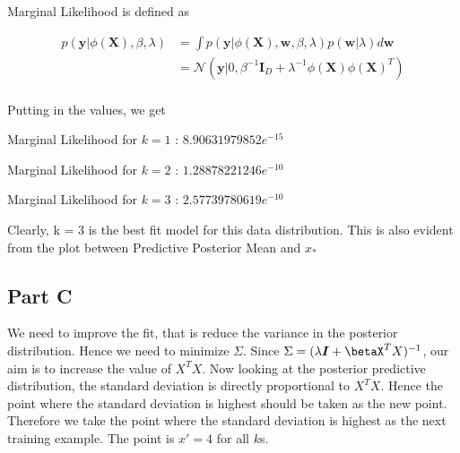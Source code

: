\documentclass{article}
\begin{document}
\begin{addmargin}{1.5em}
\begin{addmargin}{1.5em}
        Marginal Likelihood is defined as
        
        \begin{align*}
            p(\boldsymbol{y} | \phi(\boldsymbol{X}), \beta, \lambda) &= \int p(\boldsymbol{y} | \phi(\boldsymbol{X}), \boldsymbol{w}, \beta, \lambda)p(\boldsymbol{w} | \lambda)d\boldsymbol{w} \\
                                                                     &= \mathcal{N}(\boldsymbol{y} | 0, \beta^{-1}\boldsymbol{I}_D + \lambda^{-1}\phi(\boldsymbol{X})\phi(\boldsymbol{X})^T) \\
        \end{align*}
        
        Putting in the values, we get
        
        \begin{addmargin}{1.5em}
            Marginal Likelihood for $k = 1$ : $8.90631979852e^{-15}$
            
            Marginal Likelihood for $k = 2$ : $1.28878221246e^{-10}$
            
            Marginal Likelihood for $k = 3$ : $2.57739780619e^{-10}$
        \end{addmargin}
        
        Clearly, k = 3 is the best fit model for this data distribution. This is also evident from the plot between Predictive Posterior Mean and $x_*$
        
    \end{addmargin}
    
    \subsection*{Part C}
    \begin{addmargin}{1.5em}
        
        We need to improve the fit, that is reduce the variance in the posterior distribution. Hence we need to minimize $\Sigma$. Since $\Sigma = (\lambda\boldsymbol{I} + \betaX^TX)^{-1}$, our aim is to increase the value of $X^TX$. Now looking at the posterior predictive distribution, the standard deviation is directly proportional to $X^TX$. Hence the point where the standard deviation is highest should be taken as the new point. Therefore we take the point where the standard deviation is highest as the next training example. The point is $x' = 4$ for all $k$s.
        
    \end{addmargin}
    
    
\end{addmargin}
\end{document}
